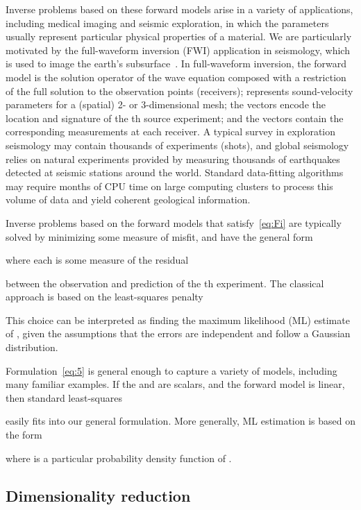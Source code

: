 \documentclass[nospthms]{svjour3}
\numberwithin{equation}{section}
\begin{document}
Inverse problems based on these forward models arise in a variety of
applications, including medical imaging and seismic exploration, in
which the parameters  usually represent particular physical
properties of a material. We are particularly motivated by the
full-waveform inversion (FWI) application in seismology, which is used
to image the earth's subsurface~\cite{Tarantola1984}.  In
full-waveform inversion, the forward model  is the solution
operator of the wave equation composed with a restriction of the full
solution to the observation points (receivers);  represents
sound-velocity parameters for a (spatial) 2- or 3-dimensional mesh;
the vectors  encode the location and signature of the th
source experiment; and the vectors  contain the corresponding
measurements at each receiver.  A typical survey in exploration
seismology may contain thousands of experiments (shots), and global
seismology relies on natural experiments provided by measuring
thousands of earthquakes detected at seismic stations around the
world.  Standard data-fitting algorithms may require months of CPU
time on large computing clusters to process this volume of data and
yield coherent geological information.

Inverse problems based on the forward models that
satisfy~\eqref{eq:Fi} are typically solved by minimizing some measure
of misfit, and have the general form

where each  is some measure of the residual

between the observation and prediction of the th experiment.  The
classical approach is based on the least-squares penalty

This choice can be interpreted as finding the maximum
  likelihood (ML) estimate of , given the
assumptions that the errors  are independent and follow a
Gaussian distribution.

Formulation~\eqref{eq:5} is general enough to capture a variety of models,
including many familiar examples. If the  and  are
scalars, and the forward model is linear, then standard least-squares

easily fits into our general formulation.
More generally, ML estimation is based on the
form

where  is a particular probability density function of .



\subsection{Dimensionality reduction} \label{sec:dr}
\end{document}
